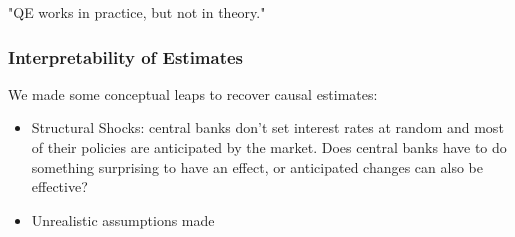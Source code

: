                 "QE works in practice, but not in theory."
                
            \subsubsection{Interpretability of Estimates}

                We made some conceptual leaps to recover causal estimates:
                \begin{itemize}
                    \item Structural Shocks: central banks don't set interest rates at random and most of their policies are anticipated by the market. Does central banks have to do something surprising to have an effect, or anticipated changes can also be effective?
                    \item Unrealistic assumptions made
                \end{itemize}
            
        
    